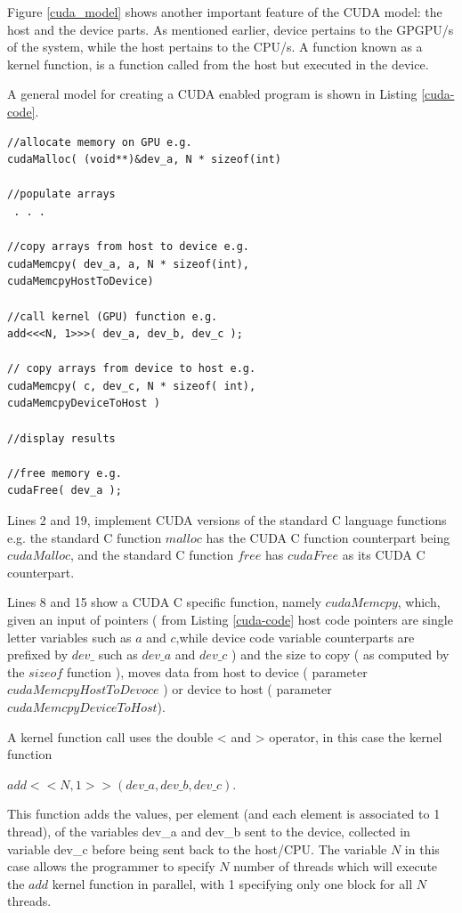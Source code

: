 \documentclass{acm_proc_article-sp}
\begin{document}
Figure \ref{cuda_model} shows another important feature of the CUDA model:
the host and the device parts. As mentioned earlier, device
pertains to the GPGPU/s of the system, while the host
pertains to the CPU/s. A function known as a kernel
function, is a function called from the host but executed in
the device.

A general model for creating a CUDA enabled program is
shown in Listing \ref{cuda-code}.


\lstset{numbers=left, numberstyle=\tiny, stepnumber=1, numbersep=5pt, label=cuda_gencode}

\begin{lstlisting}[label=cuda-code,caption=General code flow for CUDA programming]
//allocate memory on GPU e.g.
cudaMalloc( (void**)&dev_a, N * sizeof(int)

//populate arrays
 . . .

//copy arrays from host to device e.g.
cudaMemcpy( dev_a, a, N * sizeof(int), 
cudaMemcpyHostToDevice)

//call kernel (GPU) function e.g.
add<<<N, 1>>>( dev_a, dev_b, dev_c );

// copy arrays from device to host e.g.
cudaMemcpy( c, dev_c, N * sizeof( int), 
cudaMemcpyDeviceToHost )

//display results

//free memory e.g.
cudaFree( dev_a );
\end{lstlisting}

Lines 2 and 19, implement CUDA versions of
the standard C language functions e.g. the standard C
function $malloc$ has the CUDA C function counterpart being
$cudaMalloc$, and the standard C function $free$ has $cudaFree$ as its CUDA C counterpart.

Lines 8 and 15 show a CUDA C specific function, namely
$cudaMemcpy$, which, given an input of pointers ( from Listing \ref{cuda-code} host code
pointers are single letter variables such as $a$ and $c$,while
device code variable counterparts are prefixed by $dev\_$ such
as $dev\_a$ and $dev\_c$ ) and the size to copy ( as computed by
the $sizeof$ function ), moves data from host to device
( parameter $cudaMemcpyHostToDevoce$ ) or device to host
( parameter $cudaMemcpyDeviceToHost$).

A kernel function call uses the double < and > operator, in
this case the kernel function 

$add< < N, 1 > >( dev\_a, dev\_b,
dev\_c )$.

This function adds the values, per element (and
each element is associated to 1 thread), of the variables
dev\_a and dev\_b sent to the device, collected in variable
dev\_c before being sent back to the host/CPU. The variable
$N$ in this case allows the programmer to specify $N$ number of
threads which will execute the $add$ kernel function in parallel, with 1
specifying only one block for all $N$ threads.
\end{document}
